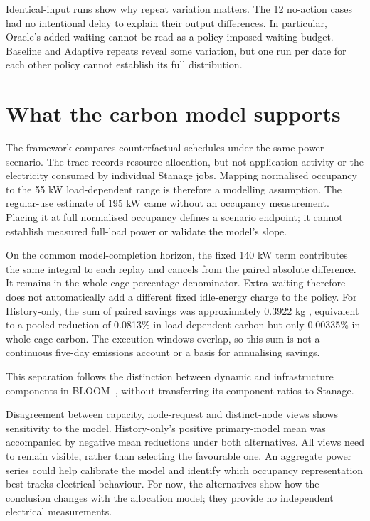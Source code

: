Identical-input runs show why repeat variation matters. The 12 no-action cases had no intentional delay to explain their output differences. In particular, Oracle's added waiting cannot be read as a policy-imposed waiting budget. Baseline and Adaptive repeats reveal some variation, but one run per date for each other policy cannot establish its full distribution.

\section{What the carbon model supports}
The framework compares counterfactual schedules under the same power scenario. The trace records resource allocation, but not application activity or the electricity consumed by individual Stanage jobs. Mapping normalised occupancy to the 55 kW load-dependent range is therefore a modelling assumption. The regular-use estimate of 195 kW came without an occupancy measurement. Placing it at full normalised occupancy defines a scenario endpoint; it cannot establish measured full-load power or validate the model's slope.

On the common model-completion horizon, the fixed 140 kW term contributes the same integral to each replay and cancels from the paired absolute difference. It remains in the whole-cage percentage denominator. Extra waiting therefore does not automatically add a different fixed idle-energy charge to the policy. For History-only, the sum of paired savings was approximately 0.3922 kg \co{}, equivalent to a pooled reduction of 0.0813\% in load-dependent carbon but only 0.00335\% in whole-cage carbon. The execution windows overlap, so this sum is not a continuous five-day emissions account or a basis for annualising savings.

This separation follows the distinction between dynamic and infrastructure components in BLOOM~\cite{luccioni2023bloom}, without transferring its component ratios to Stanage.

Disagreement between capacity, node-request and distinct-node views shows sensitivity to the model. History-only's positive primary-model mean was accompanied by negative mean reductions under both alternatives. All views need to remain visible, rather than selecting the favourable one. An aggregate power series could help calibrate the model and identify which occupancy representation best tracks electrical behaviour. For now, the alternatives show how the conclusion changes with the allocation model; they provide no independent electrical measurements.

